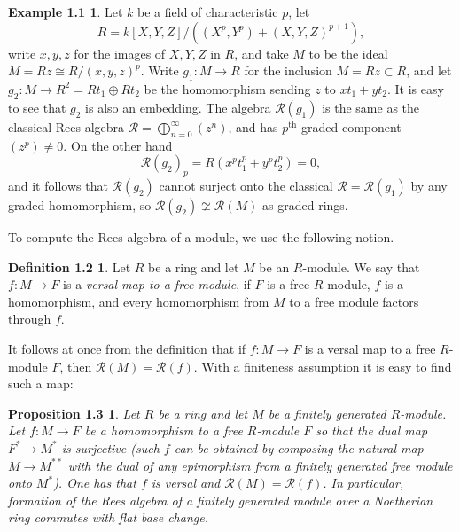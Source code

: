 \documentclass{proc-l}
\theoremstyle{plain}
\newtheorem*{theorem2}{Proposition 1.3}
\theoremstyle{definition}
\newtheorem*{definition2}{Example 1.1}
\newtheorem*{definition3}{Definition 1.2}
\newcommand{\R}{\mathcal R}
\begin{document}
\begin{definition2} Let $k$ be a field of characteristic
$p$, let
\begin{equation*}R= k[X,Y,Z]/((X^{p},Y^{p}) + (X,Y,Z)^{p+1}),
\end{equation*}
write $x,y,z$ for the images of $X,Y,Z$ in $R$, and take $M$ to be
the ideal $M = Rz \cong R/(x,y,z)^{p}$. Write $g_{1} \colon M\to R$
for the inclusion $M=Rz\subset R$, and let $g_{2} \colon M\to R^{2}=Rt_{1}\oplus Rt_{2}$ be the homomorphism sending $z$ to
$xt_{1}+yt_{2}$. It is easy to see that $g_{2}$ is also an embedding.
The algebra $\R (g_{1})$ is the same as the classical Rees algebra
$\R =\bigoplus _{n=0}^{\infty }(z^{n})$, and has $p^{\text{th}}$ graded
component $(z^{p})\neq 0$. On the other hand
\begin{equation*}\R (g_{2})_{p} = R(x^{p} t^{p}_{1} + y^{p} t^{p}_{2}) = 0,
\end{equation*}
and it follows that $\R (g_{2})$ cannot surject onto the classical
$\R =\R (g_{1})$ by any graded homomorphism, so $\R (g_{2})\not \cong \R (M)$
as graded  rings. 
\end{definition2}


To compute the Rees algebra of a module, we use the following
notion.

\begin{definition3} Let $R$ be a ring and let  $M$ be
an $R$-module. We say that $f \colon M \to F$ is a {\em versal map
to a free module}, if $F$ is a free
$R$-module, $f$ is a homomorphism, and every homomorphism 
from $M$ to a free module factors through $f$.
\end{definition3}


It follows at once from the definition that 
if $f \colon M\to F$ is a versal map to a free $R$-module
$F$, then $\R (M)=\R (f)$. With a finiteness assumption it is easy
to find such a map:

\begin{theorem2} Let $R$ be a ring and let $M$ be a
finitely generated $R$-module. Let $f \colon M\to F$ be a
homomorphism to a free $R$-module $F$ so that the dual map 
$F^{*}\to M^{*}$ is surjective (such $f$ can be obtained by 
composing the natural
map $M\to M^{**}$ with the dual of any epimorphism from a finitely
generated free module onto $M^{*}$). One has that $f$ is versal and
$\R (M)=\R (f)$. In particular, formation of
the Rees algebra of a finitely generated module over a Noetherian
ring commutes with flat base change.
\end{theorem2}
\end{document}
